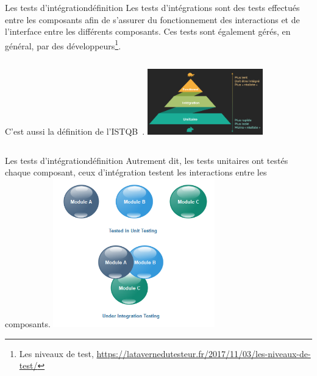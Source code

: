 \documentclass{beamer}
\begin{document}
    \begin{frame}{Les tests d'intégration}{définition}
        Les tests d’intégrations sont des tests effectués entre les composants afin de s’assurer du fonctionnement des interactions et de l’interface entre les différents composants.
        Ces tests sont également gérés, en général, par des développeurs\footnote{Les niveaux de test, \url{https://latavernedutesteur.fr/2017/11/03/les-niveaux-de-test/}}.
        \begin{columns}
            C'est aussi la définition de l'ISTQB\footnotemark~.
            \centering
            \includegraphics[width=5cm]{image/classic-test-pyramid}
        \end{columns}
    \end{frame}

    \begin{frame}{Les tests d'intégration}{définition}
        Autrement dit, les tests unitaires ont testés chaque composant, ceux d'intégration testent les interactions entre les composants.
        \bigbreak
        \centering
        \includegraphics[width=7cm]{image/integration-testing-vs-unit-testing}
    \end{frame}
\end{document}
